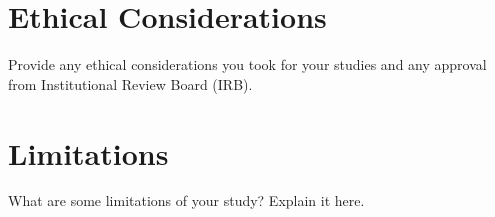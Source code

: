 \section{Ethical Considerations}

Provide any ethical considerations you took for your studies and any approval from  Institutional Review Board (IRB).

\section{Limitations}

What are some limitations of your study? Explain it here.